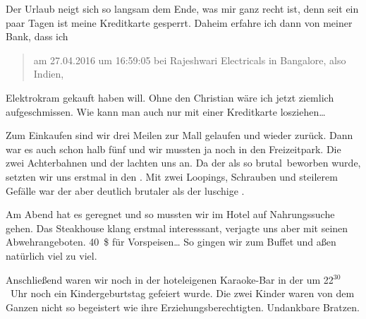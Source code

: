 Der Urlaub neigt sich so langsam dem Ende, was mir ganz recht ist, denn seit ein paar Tagen ist meine Kreditkarte gesperrt.
Daheim erfahre ich dann von meiner Bank, dass ich
\begin{quote}
	am 27.04.2016 um 16:59:05 bei Rajeshwari Electricals in Bangalore, also Indien, 
\end{quote}
Elektrokram gekauft haben will.
Ohne den Christian wäre ich jetzt ziemlich aufgeschmissen.
Wie kann man auch nur mit einer Kreditkarte losziehen\dots

Zum Einkaufen sind wir drei Meilen zur Mall gelaufen und wieder zurück.
Dann war es auch schon halb fünf und wir mussten ja noch in den  Freizeitpark.
Die zwei Achterbahnen  und der  lachten uns an.
Da der  als so \glqq brutal\grqq \, beworben wurde, setzten wir uns erstmal in den .
Mit zwei Loopings, Schrauben und steilerem Gefälle war der aber deutlich brutaler als der luschige .

Am Abend hat es geregnet und so mussten wir im Hotel auf Nahrungssuche gehen.
Das Steakhouse klang erstmal interesssant, verjagte uns aber mit seinen Abwehrangeboten.
40~\$ für Vorspeisen\dots
So gingen wir zum Buffet und aßen natürlich viel zu viel.

Anschließend waren wir noch in der hoteleigenen Karaoke-Bar in der um 22$^{30}$~Uhr noch ein Kindergeburtstag gefeiert wurde.
Die zwei Kinder waren von dem Ganzen nicht so begeistert wie ihre Erziehungsberechtigten.
Undankbare Bratzen.

